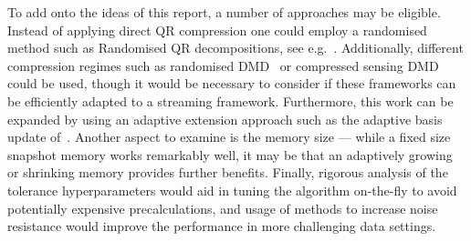 \documentclass{article}
\begin{document}
    To add onto the ideas of this report, a number of approaches may be eligible. Instead of applying direct QR compression one could employ a randomised method such as Randomised QR decompositions, see e.g.~\cite{Martinsson2017, Balabanov2022, Grigori2024}. Additionally, different compression regimes such as randomised DMD~\cite{Erichson2019} or compressed sensing DMD~\cite{Brunton2016a} could be used, though it would be necessary to consider if these frameworks can be efficiently adapted to a streaming framework. Furthermore, this work can be expanded by using an adaptive extension approach such as the adaptive basis update of~\cite{Hemati2014}. Another aspect to examine is the memory size --- while a fixed size snapshot memory works remarkably well, it may be that an adaptively growing or shrinking memory provides further benefits. Finally, rigorous analysis of the tolerance hyperparameters would aid in tuning the algorithm on-the-fly to avoid potentially expensive precalculations, and usage of methods to increase noise resistance would improve the performance in more challenging data settings.

    \printbibliography
\end{document}
